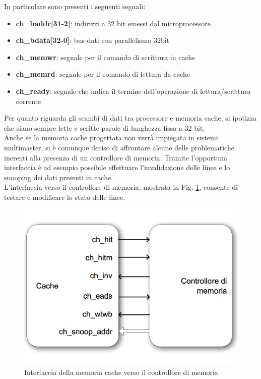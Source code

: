 In particolare sono presenti i seguenti segnali:
\begin{itemize} %
\item \textbf{ch\_baddr[31-2]}: indirizzi a 32 bit emessi dal microprocessore
\item \textbf{ch\_bdata[32-0]}: bus dati con parallelismo 32bit 
\item \textbf{ch\_memwr}: segnale per il comando di scrittura in cache
\item \textbf{ch\_memrd}: segnale per il comando di lettura da cache
\item \textbf{ch\_ready}: segnale che indica il termine dell'operazione di lettura/scrittura corrente
\end{itemize}

Per quanto riguarda gli scambi di dati tra processore e memoria cache, si ipotizza che siano sempre lette e scritte parole di lunghezza fissa a 32 bit.\\

Anche se la memoria cache progettata non verr\`a impiegata in sistemi multimaster, si \`e comunque deciso di affrontare alcune delle problematiche inerenti alla presenza di un controllore di memoria. Tramite l'opportuna interfaccia \`e ad esempio possibile effettuare l'invalidazione delle linee e lo snooping dei dati presenti in cache.\\

L'interfaccia verso il controllore di memoria, mostrata in Fig. \ref{fig:int_cnt}, consente di testare e modificare lo stato delle linee.\\

\begin{figure}[h!]
\centering
\includegraphics[width=\textwidth]{img/cache/control.png}
\caption{Interfaccia della memoria cache verso il controllore di memoria}
\label{fig:int_cnt}
\end{figure}

